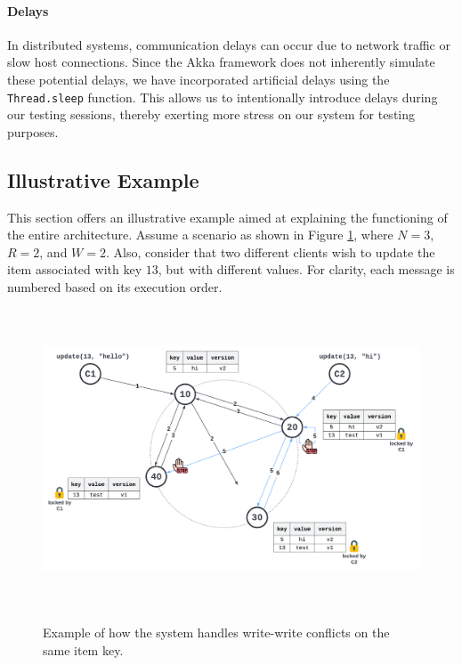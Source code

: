 \documentclass[a4paper, 11pt]{article}
\begin{document}
\paragraph{Delays} In distributed systems, communication delays can occur due to network traffic or slow host connections. Since the Akka framework does not inherently simulate these potential delays, we have incorporated artificial delays using the \texttt{Thread.sleep} function. This allows us to intentionally introduce delays during our testing sessions, thereby exerting more stress on our system for testing purposes.

\subsection{Illustrative Example}
This section offers an illustrative example aimed at explaining the functioning of the entire architecture. Assume a scenario as shown in Figure \ref{example}, where $N=3$, $R=2$, and $W=2$. Also, consider that two different clients wish to update the item associated with key $13$, but with different values. For clarity, each message is numbered based on its execution order.

\begin{figure}[htb]
\begin{center}
\label{example}
\includegraphics[height=3.5in]{example.pdf}
\caption{Example of how the system handles write-write conflicts on the same item key.}
\end{center}
\end{figure}
\end{document}
